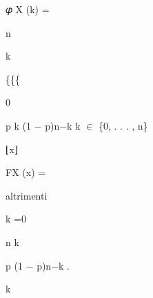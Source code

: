 \documentclass[a4paper,portrait,12pt]{article}
\begin{document}
\begin{flushleft}
𝜑 X (k) =
\end{flushleft}





\begin{flushleft}
n
\end{flushleft}


\begin{flushleft}
k
\end{flushleft}





\{\{\{


0





\begin{flushleft}
p k (1 $-$ p)n$-$k k $\in$ \{0, . . . , n\}
\end{flushleft}





\begin{flushleft}
⌊x⌋
\end{flushleft}





\begin{flushleft}
FX (x) =
\end{flushleft}





\begin{flushleft}
altrimenti
\end{flushleft}





\begin{flushleft}
k =0
\end{flushleft}





\begin{flushleft}
n k
\end{flushleft}


\begin{flushleft}
p (1 $-$ p)n$-$k .
\end{flushleft}


\begin{flushleft}
k
\end{flushleft}
\end{document}
